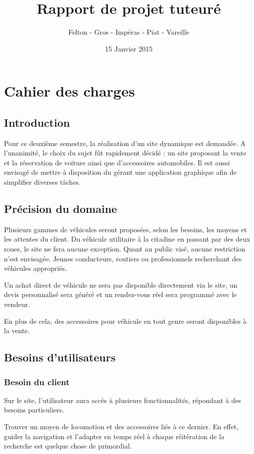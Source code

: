 \documentclass[a4paper]{article}
\title{\Huge \textbf{Rapport de projet tuteuré}}
\author{\Large Felton - Gros - Impéras - Piat - Vareille}
\date{15 Janvier 2015}
\begin{document}
\maketitle
\newpage

\tableofcontents
\newpage

\section{Cahier des charges}
	\subsection*{Introduction}
	
	Pour ce deuxième semestre, la réalisation d'un site dynamique est demandée. A l'unanimité, le choix du sujet fût rapidement décidé : un site proposant la vente et la réservation de voiture ainsi que d'accessoires automobiles. Il est aussi envisagé de mettre à disposition du gérant une application graphique afin de simplifier diverses tâches.
	\subsection{Précision du domaine}
	
	Plusieurs gammes de véhicules seront proposées, selon les besoins, les moyens et les attentes du client. Du véhicule utilitaire à la citadine en passant par des deux roues, le site ne fera aucune exception. Quant au public visé, aucune restriction n'est envisagée. Jeunes conducteurs, routiers ou professionnels recherchant des véhicules appropriés.
	
	Un achat direct de véhicule ne sera pas disponible directement via le site, un devis personnalisé sera généré et un rendez-vous réel sera programmé avec le vendeur.
	
	En plus de cela, des accessoires pour véhicule en tout genre seront disponibles à la vente.
	\subsection{Besoins d'utilisateurs}
		\subsubsection{Besoin du client}
	Sur le site, l'utilisateur aura accès à plusieurs fonctionnalités, répondant à des besoins particuliers.
	
	Trouver un moyen de locomotion et des accessoires liés à ce dernier.
	En effet, guider la navigation et l'adapter en temps réel à chaque réitération de la recherche est quelque chose de primordial. 
	
\end{document}
